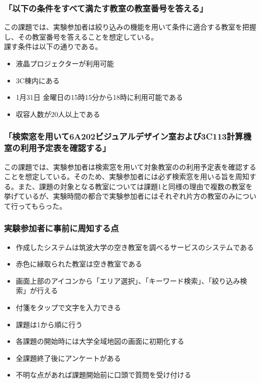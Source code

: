 \documentclass[12pt,a4paper,dvipdf]{jsarticle}
\begin{document}
\subsubsection{「以下の条件をすべて満たす教室の教室番号を答える」}
この課題では、実験参加者は絞り込みの機能を用いて条件に適合する教室を把握し、その教室番号を答えることを想定している。\\
課す条件は以下の通りである。
\begin{itemize}
    \item 液晶プロジェクターが利用可能
    \item 3C棟内にある
    \item 1月31日 金曜日の15時15分から18時に利用可能である
    \item 収容人数が20人以上である
\end{itemize}

\subsubsection{「検索窓を用いて6A202ビジュアルデザイン室および3C113計算機室の利用予定表を確認する」}
この課題では、実験参加者は検索窓を用いて対象教室のの利用予定表を確認することを想定している。そのため、実験参加者には必ず検索窓を用いる旨を周知する。また、課題の対象となる教室については課題1と同様の理由で複数の教室を挙げているが、実験時間の都合で実験参加者にはそれぞれ片方の教室のみについて行ってもらった。
\subsubsection{実験参加者に事前に周知する点}
\begin{itemize}
    \item 作成したシステムは筑波大学の空き教室を調べるサービスのシステムである
    \item 赤色に縁取られた教室は空き教室である
    \item 画面上部のアイコンから「エリア選択」、「キーワード検索」、「絞り込み検索」が行える
    \item 付箋をタップで文字を入力できる
    \item 課題は1から順に行う
    \item 各課題の開始時には大学全域地図の画面に初期化する
    \item 全課題終了後にアンケートがある
    \item 不明な点があれば課題開始前に口頭で質問を受け付ける
\end{itemize}

\newpage
\end{document}

